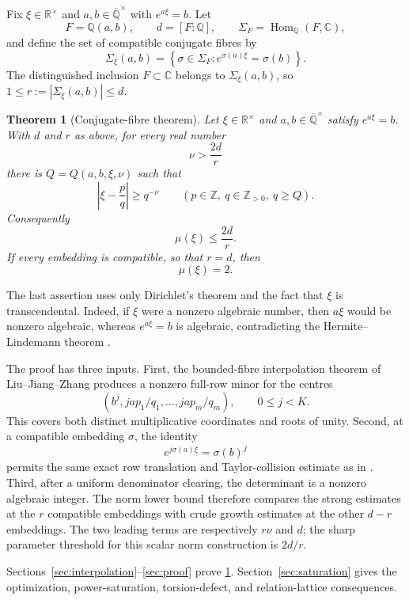 \documentclass[11pt]{article}
\newcommand{\CC}{\mathbb C}
\newcommand{\RR}{\mathbb R}
\newcommand{\QQ}{\mathbb Q}
\newcommand{\ZZ}{\mathbb Z}
\newcommand{\Qbar}{\overline{\mathbb Q}}
\newcommand{\Comp}{\Sigma_{\xi}(a,b)}
\DeclareMathOperator{\Hom}{Hom}
\newtheorem{theorem}{Theorem}[section]
\theoremstyle{definition}
\theoremstyle{remark}
\numberwithin{equation}{section}
\begin{document}
Fix $\xi\in\RR^\times$ and $a,b\in\Qbar^\times$ with $e^{a\xi}=b$.
Let
\[
 F=\QQ(a,b),\qquad d=[F:\QQ],\qquad
 \Sigma_F=\Hom_{\QQ}(F,\CC),
\]
and define the set of compatible conjugate fibres by
\begin{equation}\label{eq:compatible-set}
 \Comp=
 \left\{\sigma\in\Sigma_F:
   e^{\sigma(a)\xi}=\sigma(b)\right\}.
\end{equation}
The distinguished inclusion $F\subset\CC$ belongs to $\Comp$, so
$1\le r:=|\Comp|\le d$.

\begin{theorem}[Conjugate-fibre theorem]\label{thm:main}
Let $\xi\in\RR^\times$ and $a,b\in\Qbar^\times$ satisfy $e^{a\xi}=b$.
With $d$ and $r$ as above, for every real number
\[
  \nu>\frac{2d}{r}
\]
there is $Q=Q(a,b,\xi,\nu)$ such that
\[
  \left|\xi-\frac pq\right|\ge q^{-\nu}
  \qquad(p\in\ZZ,\ q\in\ZZ_{>0},\ q\ge Q).
\]
Consequently
\[
  \boxed{\mu(\xi)\le\frac{2d}{r}}.
\]
If every embedding is compatible, so that $r=d$, then
\[
  \boxed{\mu(\xi)=2}.
\]
\end{theorem}

The last assertion uses only Dirichlet's theorem and the fact that
$\xi$ is transcendental.  Indeed, if $\xi$ were a nonzero algebraic
number, then $a\xi$ would be nonzero algebraic, whereas
$e^{a\xi}=b$ is algebraic, contradicting the Hermite--Lindemann theorem
\cite[Chapter~1]{Baker1975}.

The proof has three inputs.  First, the bounded-fibre interpolation
theorem of Liu--Jiang--Zhang produces a nonzero full-row minor for the
centres
\[
  (b^j,ja p_1/q_1,\ldots,ja p_m/q_m),\qquad 0\le j<K.
\]
This covers both distinct multiplicative coordinates and roots of
unity.  Second, at a compatible embedding $\sigma$, the identity
\[
 e^{j\sigma(a)\xi}=\sigma(b)^j
\]
permits the same exact row translation and Taylor-collision estimate as
in \cite{LiuJiangZhang2026}.  Third, after a uniform denominator
clearing, the determinant is a nonzero algebraic integer.  The norm
lower bound therefore compares the strong estimates at the $r$
compatible embeddings with crude growth estimates at the other $d-r$
embeddings.  The two leading terms are respectively $r\nu$ and $d$;
the sharp parameter threshold for this scalar norm construction is
$2d/r$.

Sections~\ref{sec:interpolation}--\ref{sec:proof} prove
\cref{thm:main}.  Section~\ref{sec:saturation} gives the optimization,
power-saturation, torsion-defect, and relation-lattice consequences.
\end{document}
